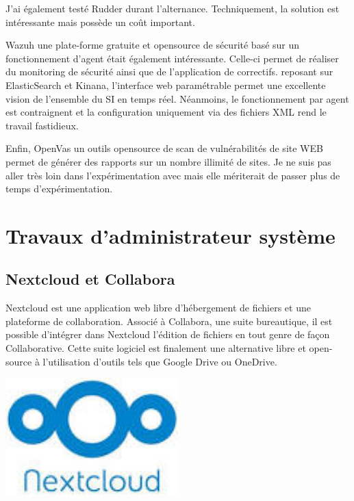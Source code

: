 \documentclass[12pt]{article}
\begin{document}
J'ai également testé Rudder durant l'alternance. 
Techniquement, la solution est intéressante mais possède un coût important.

Wazuh une plate-forme gratuite et opensource de sécurité basé sur un fonctionnement d'agent était également intéressante. 
Celle-ci permet de réaliser du monitoring de sécurité ainsi que de l'application de correctifs. reposant sur ElasticSearch et Kinana, l'interface web paramétrable permet une excellente vision de l'ensemble du SI en temps réel. 
Néanmoins, le fonctionnement par agent est contraignent et la configuration uniquement via des fichiers XML rend le travail fastidieux.

Enfin, OpenVas un outils opensource de scan de vulnérabilités de site WEB permet de générer des rapports sur un nombre illimité de sites. 
Je ne suis pas aller très loin dans l'expérimentation avec mais elle mériterait de passer plus de temps d'expérimentation.

\newpage
\section{Travaux d'administrateur système}
\subsection{Nextcloud et Collabora}
\noindent%
\begin{minipage}{.7\textwidth}%
Nextcloud est une application web libre d'hébergement de fichiers et une plateforme de collaboration. 
Associé à Collabora, une suite bureautique, il est possible d'intégrer dans Nextcloud l'édition de fichiers en tout genre de façon Collaborative. 
Cette suite logiciel est finalement une alternative libre et open-source à l'utilisation d'outils tels que Google Drive ou OneDrive.
\end{minipage}%
\hfill
\begin{minipage}{.3\textwidth}%
\begin{center}
\includegraphics[width=0.5\textwidth]{src/nextcloud.jpeg}
\end{center}
\end{minipage}%
\end{document}
